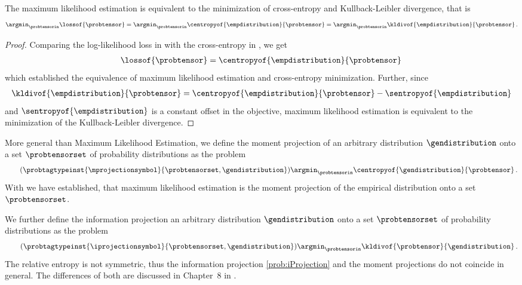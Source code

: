 \begin{lemma}
    \label{lem:centropyMLE}
    The maximum likelihood estimation  is equivalent to the minimization of cross-entropy and Kullback-Leibler divergence, that is
    \begin{align*}
        \argmin_{\probtensorin} \lossof{\probtensor}
        = \argmin_{\probtensorin} \centropyof{\empdistribution}{\probtensor}
        = \argmin_{\probtensorin} \kldivof{\empdistribution}{\probtensor} \, .
    \end{align*}
\end{lemma}
\begin{proof}
    Comparing the log-likelihood loss in  with the cross-entropy in , we get
    \begin{align*}
        \lossof{\probtensor} = \centropyof{\empdistribution}{\probtensor} \,
    \end{align*}
    which established the equivalence of maximum likelihood estimation and cross-entropy minimization.
    Further, since
    \begin{align*}
        \kldivof{\empdistribution}{\probtensor} = \centropyof{\empdistribution}{\probtensor} - \sentropyof{\empdistribution}
    \end{align*}
    and $\sentropyof{\empdistribution}$ is a constant offset in the objective, maximum likelihood estimation is equivalent to the minimization of the Kullback-Leibler divergence.
\end{proof}

More general than Maximum Likelihood Estimation, we define the moment projection of an arbitrary distribution $\gendistribution$ onto a set $\probtensorset$ of probability distributions as the problem
\begin{align}
    \label{prob:mProjection}\tag{$\probtagtypeinst{\mprojectionsymbol}{\probtensorset,\gendistribution}$}
    \argmin_{\probtensorin} \centropyof{\gendistribution}{\probtensor} \, . %
\end{align}
With  we have established, that maximum likelihood estimation is the moment projection of the empirical distribution onto a set $\probtensorset$.

We further define the information projection an arbitrary distribution $\gendistribution$ onto a set $\probtensorset$ of probability distributions as the problem
\begin{align}
    \label{prob:iProjection}\tag{$\probtagtypeinst{\iprojectionsymbol}{\probtensorset,\gendistribution}$}
    \argmin_{\probtensorin} \kldivof{\probtensor}{\gendistribution} \, .
\end{align}
The relative entropy is not symmetric, thus the information projection \eqref{prob:iProjection} and the moment projections do not coincide in general.
The differences of both are discussed in Chapter~8 in \cite{koller_probabilistic_2009}.

